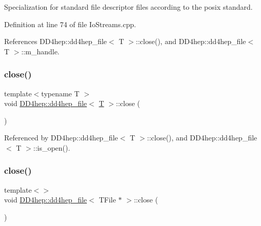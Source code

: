 Specialization for standard file descriptor files according to the posix standard. 



Definition at line 74 of file Io\+Streams.\+cpp.



References D\+D4hep\+::dd4hep\+\_\+file$<$ T $>$\+::close(), and D\+D4hep\+::dd4hep\+\_\+file$<$ T $>$\+::m\+\_\+handle.

\hypertarget{class_d_d4hep_1_1dd4hep__file_afdabf56b0a0af86b2199e075ab1b2499}{}\label{class_d_d4hep_1_1dd4hep__file_afdabf56b0a0af86b2199e075ab1b2499} 
\subsubsection{\texorpdfstring{close()}{close()}\hspace{0.1cm}{\footnotesize\ttfamily [2/3]}}
{\footnotesize\ttfamily template$<$typename T $>$ \\
void \hyperlink{class_d_d4hep_1_1dd4hep__file}{D\+D4hep\+::dd4hep\+\_\+file}$<$ \hyperlink{class_t}{T} $>$\+::close (\begin{DoxyParamCaption}{ }\end{DoxyParamCaption})}



Referenced by D\+D4hep\+::dd4hep\+\_\+file$<$ T $>$\+::close(), and D\+D4hep\+::dd4hep\+\_\+file$<$ T $>$\+::is\+\_\+open().

\hypertarget{class_d_d4hep_1_1dd4hep__file_a5f05024772ae9f03845bc14443a99354}{}\label{class_d_d4hep_1_1dd4hep__file_a5f05024772ae9f03845bc14443a99354} 
\subsubsection{\texorpdfstring{close()}{close()}\hspace{0.1cm}{\footnotesize\ttfamily [3/3]}}
{\footnotesize\ttfamily template$<$$>$ \\
void \hyperlink{class_d_d4hep_1_1dd4hep__file}{D\+D4hep\+::dd4hep\+\_\+file}$<$ T\+File $\ast$ $>$\+::close (\begin{DoxyParamCaption}{ }\end{DoxyParamCaption})}



